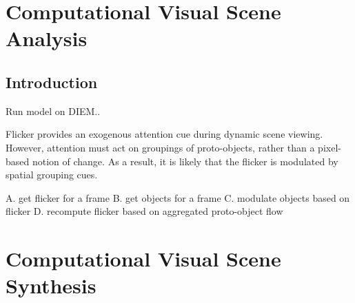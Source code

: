 \documentclass[a4paper,10pt,final]{ThesisStyle}
\begin{document}




\chapter{Computational Visual Scene Analysis}
\label{ch:analysis-visual}
\minitoc

\section{Introduction}  

Run model on DIEM..

Flicker provides an exogenous attention cue during dynamic scene viewing.  However, attention must act on groupings of proto-objects, rather than a pixel-based notion of change.  As a result, it is likely that the flicker is modulated by spatial grouping cues.  

A. get flicker for a frame
B. get objects for a frame
C. modulate objects based on flicker
D. recompute flicker based on aggregated proto-object flow






\chapter{Computational Visual Scene Synthesis}
\label{ch:synthesis-visual}
\end{document}

